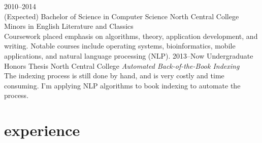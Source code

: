 \documentclass[]{friggeri-cv} %
\begin{document}
\begin{entrylist}
\entry
{2010--2014 \\(Expected)}
{Bachelor of Science {\normalfont in Computer Science}}
{North Central College}
{Minors in English Literature and Classics \\
Coursework placed emphasis on algorithms, theory, application development, and writing.
Notable courses include operating systems, bioinformatics, mobile applications, and natural language processing (NLP).}
\entry
{2013--Now}
{Undergraduate {\normalfont Honors Thesis}}
{North Central College}
{\emph{Automated Back-of-the-Book Indexing} \\
The indexing process is still done by hand, and is very costly and time consuming.
I'm applying NLP algorithms to book indexing to automate the process.}
\end{entrylist}


\section{experience}
\end{document}
